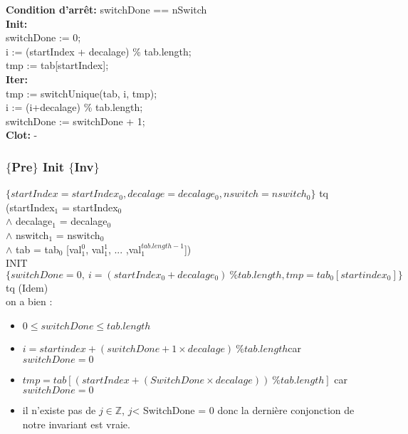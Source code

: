 \noindent \textbf{Condition d'arrêt:} switchDone == nSwitch\\

\noindent \textbf{Init:}\\
switchDone := 0;\\
i := (startIndex + decalage) \% tab.length;\\
tmp := tab[startIndex];\\

\noindent \textbf{Iter: }\\
tmp := switchUnique(tab, i, tmp);\\
i := (i+decalage) \% tab.length;\\
switchDone := switchDone + 1;\\

\noindent \textbf{Clot: } -\\



\subsubsection*{$\{$Pre$\}$ Init $\{$Inv$\}$}

$\{startIndex = startIndex_{0}, decalage = decalage_{0}, nswitch = nswitch_{0} \}$ tq (startIndex$_{1}$ = startIndex$_{0}$ \\
$\wedge$ decalage$_{1}$ = decalage$_{0}$\\
$\wedge$ nswitch$_{1}$ = nswitch$_{0}$\\
$\wedge$ tab = tab$_{0}$ [val$_{1}^{0}$, val$_{1}^{1}$, ... ,val$_{1}^{tab.length-1}$])\\

INIT \\

$\{switchDone = 0,\ i = (startIndex_0 + decalage_0)\ \% tab.length, tmp = tab_0[startindex_0]\}$ tq (Idem)\\
on a bien : 
\begin{itemize}
	\item $0\leq switchDone \leq tab.length$
	\item $i = startindex + (switchDone+1\times decalage)\ \% tab.length $car$ switchDone = 0$
	\item $tmp = tab[(startIndex + (SwitchDone\times decalage))\ \% tab.length]$ car $switchDone = 0$
	\item il n'existe pas de $j \in \mathbb{Z}$, $j$< SwitchDone = 0 donc la dernière conjonction de notre invariant est vraie. \\
\end{itemize}



